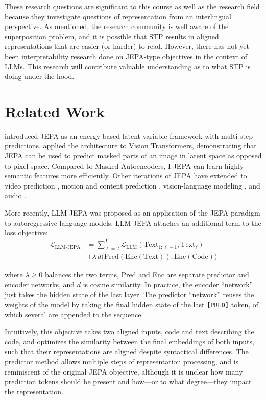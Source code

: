 \documentclass[11pt]{article}
\begin{document}
These research questions are significant to this course as well as the research field because they investigate questions of representation from an interlingual perspective. As mentioned, the research community is well aware of the superposition problem, and it is possible that STP results in aligned representations that are easier (or harder) to read. However, there has not yet been interpretability research done on JEPA-type objectives in the context of LLMs. This research will contribute valuable understanding as to what STP is doing under the hood.

\section{Related Work}

\citet{Dawid_2024} introduced JEPA as an energy-based latent variable framework with multi-step predictions. \citet{assran2023self} applied the architecture to Vision Transformers, demonstrating that JEPA can be used to predict masked parts of an image in latent space as opposed to pixel space. Compared to Masked Autoencoders, I-JEPA can learn highly semantic features more efficiently. Other iterations of JEPA have extended to video prediction \cite{bardes2024vjepa}, motion and content prediction \cite{bardes2024mcjepa}, vision-language modeling \cite{chen2026vljepa}, and audio \cite{fei2023jepa}.

More recently, LLM-JEPA \cite{huang2026llmjepa} was proposed as an application of the JEPA paradigm to autoregressive language models. LLM-JEPA attaches an additional term to the loss objective:
\begin{align}
  \mathcal{L}_{\text{LLM-JEPA}} &= \sum_{\ell=2}^{L} \mathcal{L}_{\text{LLM}}(\text{Text}_{1:\ell-1}, \text{Text}_\ell) \label{eq:llm-jepa-loss} \\
  &+ \lambda \, d \big( \text{Pred}(\text{Enc}(\text{Text})), \text{Enc}(\text{Code}) \big) \nonumber
\end{align}

where $\lambda \geq 0$ balances the two terms, Pred and Enc are separate predictor and encoder networks, and $d$ is cosine similarity. In practice, the encoder ``network'' just takes the hidden state of the last layer. The predictor ``network'' reuses the weights of the model by taking the final hidden state of the last \texttt{[PRED]} token, of which several are appended to the sequence.

Intuitively, this objective takes two aligned inputs, code and text describing the code, and optimizes the similarity between the final embeddings of both inputs, such that their representations are aligned despite syntactical differences. The predictor method allows multiple steps of representation processing, and is reminiscent of the original JEPA objective, although it is unclear how many prediction tokens should be present and how---or to what degree---they impact the representation.
\end{document}
